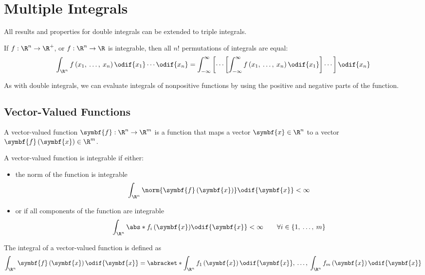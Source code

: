 \documentclass{article}
\begin{document}
\section{Multiple Integrals}
All results and properties for double integrals can be extended to
triple integrals.
\begin{theorem}
    If \(f : \R^n \to \R^+\), or \(f : \R^n \to \R\) is integrable, then
    all \(n! \) permutations of integrals are equal:
    \begin{equation*}
        \int_{\R^n} f\left( x_1,\: \ldots,\: x_n \right) \odif{x_1} \cdots \odif{x_n} = \int_{-\infty}^\infty \left[ \cdots \left[ \int_{-\infty}^\infty f\left( x_1,\: \ldots,\: x_n \right) \odif{x_1} \right] \cdots \right] \odif{x_n}
    \end{equation*}
\end{theorem}
As with double integrals, we can evaluate integrals of nonpositive
functions by using the positive and negative parts of the function.
\subsection{Vector-Valued Functions}
\begin{definition}
    A vector-valued function \(\symbf{f} : \R^n \to \R^m\) is a
    function that maps a vector \(\symbf{x} \in \R^n\) to a vector
    \(\symbf{f}\left( \symbf{x} \right) \in \R^m\).
\end{definition}
A vector-valued function is integrable if either:
\begin{itemize}
    \item the norm of the function is integrable
          \begin{equation*}
              \int_{\R^n} \norm{\symbf{f}\left( \symbf{x} \right)} \odif{\symbf{x}} < \infty
          \end{equation*}
    \item or if all components of the function are integrable
          \begin{equation*}
              \int_{\R^n} \abs*{f_i\left( \symbf{x} \right)} \odif{\symbf{x}} < \infty \qquad \forall i \in \left\{ 1,\: \ldots,\: m \right\}
          \end{equation*}
\end{itemize}
The integral of a vector-valued function is defined as
\begin{equation*}
    \int_{\R^n} \symbf{f}\left( \symbf{x} \right) \odif{\symbf{x}} = \abracket*{\int_{\R^n} f_1\left( \symbf{x} \right) \odif{\symbf{x}},\: \ldots,\: \int_{\R^n} f_m\left( \symbf{x} \right) \odif{\symbf{x}}}
\end{equation*}
\end{document}
